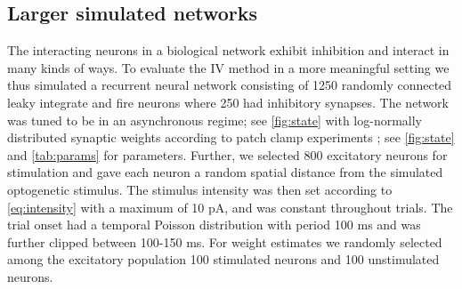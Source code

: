 \documentclass[11pt]{article}
\begin{document}
\subsection{Larger simulated networks}
The interacting neurons in a biological network exhibit inhibition and interact in many kinds of ways. To evaluate the IV method in a more meaningful setting we thus simulated a recurrent neural network consisting of 1250 randomly connected leaky integrate and fire neurons where 250 had inhibitory synapses. The network was tuned to be in an asynchronous regime; see \cref{fig:state} with log-normally distributed synaptic weights according to patch clamp experiments \citep{Sayer1990,Mason1991}; see \cref{fig:state} and \cref{tab:params} for parameters. Further, we selected 800 excitatory neurons for stimulation and gave each neuron a random spatial distance from the simulated optogenetic stimulus. The stimulus intensity was then set according to \cref{eq:intensity} with a maximum of 10 pA, and was constant throughout trials. The trial onset had a temporal Poisson distribution with period 100 ms and was further clipped between 100-150 ms. For weight estimates we randomly selected among the excitatory population 100 stimulated neurons and 100 unstimulated neurons. 
\end{document}
